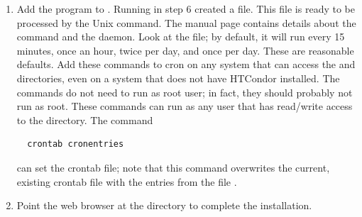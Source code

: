 \begin{enumerate}
\item Add the  program to .  
Running  in step 6 created a  file.
This  file is ready to be processed by the Unix
 command.
The  manual page contains details about
the  command and the  daemon.
Look at the
 file; by default, it will run 
  every 15 minutes, 
  once an hour, 
  twice per day, and 
  once per day.
These are reasonable defaults.  
Add these commands to cron on any
system that can access the  and
 directories,
even on a system that does not have HTCondor installed.
The commands do not need to run as root user;
in fact, they should probably not run as root.  These commands can run
as any user that has read/write access to the  directory.
The command
\begin{verbatim} 
  crontab cronentries
\end{verbatim}
can set the crontab file;
note that this command overwrites the current, existing crontab file with the 
entries from the file .

\item Point the web browser at the  directory
to complete the installation.

\end{enumerate}

